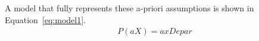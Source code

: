 A model that fully represents these a-priori assumptions is shown in Equation~\ref{eq:model1}.
\begin{align}
    P(aX) = axDepar
\end{align}
